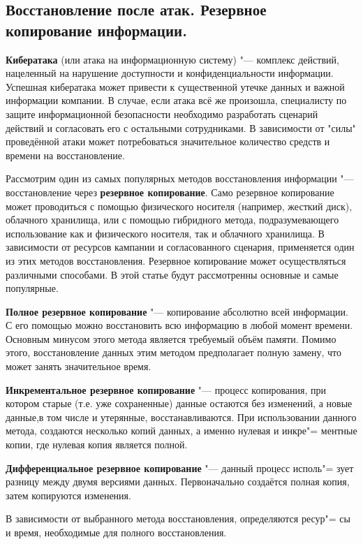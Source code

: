 \newpage
\subsection{Восстановление после атак. Резервное копирование информации.}
    \textbf{Кибератака} (или атака на информационную систему) "--- комплекс действий, нацеленный на нарушение доступности и конфиденциальности информации.
    Успешная кибератака может привести к существенной утечке данных и важной информации компании.
    В случае, если атака всё же произошла, специалисту по защите информационной безопасности необходимо разработать сценарий действий и согласовать его 
    с остальными сотрудниками. В зависимости от "силы" проведённой атаки может потребоваться значительное количество средств и времени на восстановление.

    Рассмотрим один из самых популярных методов восстановления информации "--- восстановление через \textbf{резервное копирование}. Само резервное копирование 
    может проводиться с помощью физического носителя (например, жесткий диск), облачного хранилища, или с помощью гибридного метода, подразумевающего использование
    как и физического носителя, так и облачного хранилища. В зависимости от ресурсов кампании и согласованного сценария, применяется один из этих методов восстановления.
    Резервное копирование может осуществляться различными способами. В этой статье будут рассмотренны основные и самые популярные.

    \textbf{Полное резервное копирование} "--- копирование абсолютно всей информации. С его помощью можно восстановить всю информацию в любой момент времени. Основным минусом
    этого метода является требуемый объём памяти. Помимо этого, восстановление данных этим методом предполагает полную замену, что может занять значительное время.

    \textbf{Инкрементальное резервное копирование} "--- процесс копирования, при котором старые (т.е. уже сохраненные) данные остаются без изменений, а новые данные,в том числе и утерянные, 
    восстанавливаются. При использовании данного метода, создаются несколько копий данных, а именно нулевая и инкре"=
    ментные копии, где нулевая копия является полной.

    \textbf{Дифференциальное резервное копирование} "--- данный процесс исполь"=
    зует разницу между двумя версиями данных. Первоначально создаётся полная копия, затем копируются изменения.

    В зависимости от выбранного метода восстановления, определяются ресур"=
    сы и время, необходимые для полного восстановления.


